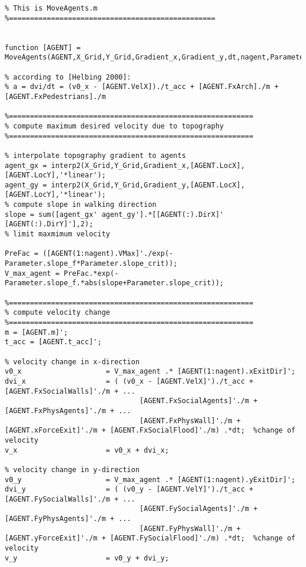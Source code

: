 \lstset{basicstyle=\footnotesize\ttfamily}
    
\begin{lstlisting}[breaklines]
%=================================================
% This is MoveAgents.m
%=================================================


function [AGENT] = MoveAgents(AGENT,X_Grid,Y_Grid,Gradient_x,Gradient_y,dt,nagent,Parameter)

% according to [Helbing 2000]:
% a = dvi/dt = (v0_x - [AGENT.VelX])./t_acc + [AGENT.FxArch]./m + [AGENT.FxPedestrians]./m

%==========================================================
% compute maximum desired velocity due to topography
%==========================================================

% interpolate topography gradient to agents
agent_gx = interp2(X_Grid,Y_Grid,Gradient_x,[AGENT.LocX],[AGENT.LocY],'*linear');
agent_gy = interp2(X_Grid,Y_Grid,Gradient_y,[AGENT.LocX],[AGENT.LocY],'*linear');
% compute slope in walking direction
slope = sum([agent_gx' agent_gy'].*[[AGENT(:).DirX]' [AGENT(:).DirY]'],2);
% limit maxmimum velocity

PreFac = ([AGENT(1:nagent).VMax]'./exp(-Parameter.slope_f*Parameter.slope_crit));
V_max_agent = PreFac.*exp(-Parameter.slope_f.*abs(slope+Parameter.slope_crit));

%==========================================================
% compute velocity change
%==========================================================
m = [AGENT.m]';
t_acc = [AGENT.t_acc]';

% velocity change in x-direction
v0_x                    = V_max_agent .* [AGENT(1:nagent).xExitDir]';
dvi_x                   = ( (v0_x - [AGENT.VelX]')./t_acc + [AGENT.FxSocialWalls]'./m + ...
                                [AGENT.FxSocialAgents]'./m + [AGENT.FxPhysAgents]'./m + ...
                                [AGENT.FxPhysWall]'./m + [AGENT.xForceExit]'./m + [AGENT.FxSocialFlood]'./m) .*dt;	%change of velocity
v_x                     = v0_x + dvi_x;

% velocity change in y-direction
v0_y                    = V_max_agent .* [AGENT(1:nagent).yExitDir]';
dvi_y                   = ( (v0_y - [AGENT.VelY]')./t_acc + [AGENT.FySocialWalls]'./m + ...
                                [AGENT.FySocialAgents]'./m + [AGENT.FyPhysAgents]'./m + ...
                                [AGENT.FyPhysWall]'./m + [AGENT.yForceExit]'./m + [AGENT.FySocialFlood]'./m) .*dt;	%change of velocity
v_y                     = v0_y + dvi_y;


\end{lstlisting}
